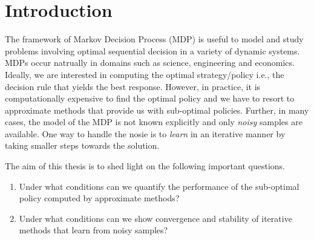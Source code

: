 \chapter{Introduction}
The framework of Markov Decision Process (MDP) is useful to model and study problems involving optimal sequential decision in a variety of dynamic systems. MDPs occur natrually in domains such as science, engineering and economics. Ideally, we are interested in computing the optimal strategy/policy i.e., the decision rule that yields the best response. However, in practice, it is computationally expensive to find the optimal policy and we have to resort to approximate methods that provide us with sub-optimal policies. Further, in many cases, the model of the MDP is not known explicitly and only \emph{noisy} samples are available. One way to handle the nosie is to \emph{learn} in an iterative manner by taking smaller steps towards the solution.\par
The aim of this thesis is to shed light on the following important questions.
\begin{enumerate}
\item Under what conditions can we quantify the performance of the sub-optimal policy computed by approximate methods?
\item Under what conditions can we show convergence and stability of iterative methods that learn from noisy samples?
\end{enumerate}
